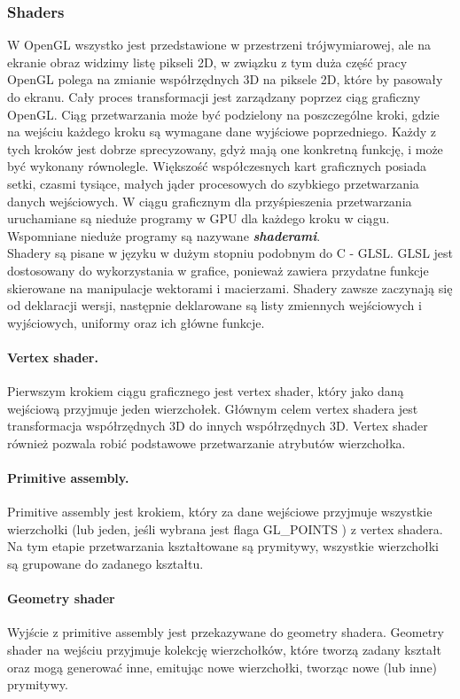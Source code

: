 \documentclass[paper=a4, fontsize=11pt]{scrartcl} %
\begin{document}
\subsubsection{Shaders}
W OpenGL wszystko jest przedstawione w przestrzeni trójwymiarowej, ale na ekranie obraz widzimy listę pikseli 2D, w związku z tym duża część pracy OpenGL polega na zmianie współrzędnych 3D na piksele 2D, które by pasowały do ekranu. Cały proces transformacji jest zarządzany poprzez ciąg graficzny OpenGL. Ciąg przetwarzania może być podzielony na poszczególne kroki, gdzie na wejściu każdego kroku są wymagane dane wyjściowe poprzedniego. Każdy z tych kroków jest dobrze sprecyzowany, gdyż mają one konkretną funkcję, i może być wykonany równolegle. Większość współczesnych kart graficznych posiada setki, czasmi tysiące, małych jąder procesowych do szybkiego przetwarzania danych wejściowych. W ciągu graficznym dla przyśpieszenia przetwarzania uruchamiane są nieduże programy w GPU dla każdego kroku w ciągu. Wspomniane nieduże programy są nazywane \textit{\textbf{shaderami}}.\\
Shadery są pisane w języku w dużym stopniu podobnym do C - GLSL. GLSL jest dostosowany do wykorzystania w grafice, ponieważ zawiera przydatne funkcje skierowane na manipulacje wektorami i macierzami. Shadery zawsze zaczynają się od deklaracji wersji, następnie deklarowane są listy zmiennych wejściowych i wyjściowych, uniformy oraz ich główne funkcje. 
\paragraph*{Vertex shader.}
Pierwszym krokiem ciągu graficznego jest vertex shader, który jako daną wejściową przyjmuje jeden wierzchołek. Głównym celem vertex shadera jest transformacja współrzędnych 3D do innych współrzędnych 3D. Vertex shader również pozwala robić podstawowe przetwarzanie atrybutów wierzchołka.
\paragraph*{Primitive assembly.}
Primitive assembly jest krokiem, który za dane wejściowe przyjmuje wszystkie wierzchołki (lub jeden, jeśli wybrana jest flaga GL\_POINTS ) z vertex shadera. Na tym etapie przetwarzania kształtowane są prymitywy, wszystkie wierzchołki są grupowane do zadanego kształtu.
\paragraph*{Geometry shader}
Wyjście z primitive assembly jest przekazywane do geometry shadera. Geometry shader na wejściu przyjmuje kolekcję wierzchołków, które tworzą zadany kształt oraz mogą generować inne, emitując nowe wierzchołki, tworząc nowe (lub inne) prymitywy. 
\end{document}
